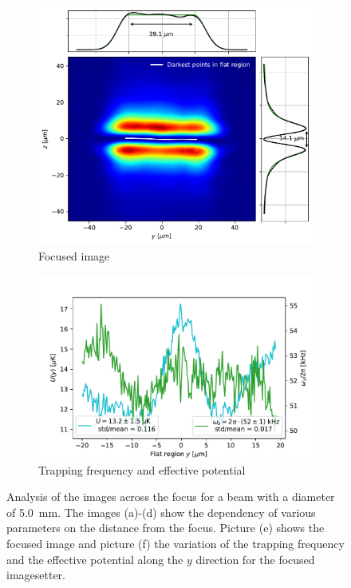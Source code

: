 \begin{figure}
    \begin{subfigure}{0.5\textwidth}
        \includegraphics[width=\textwidth]{chapters/chapter_3/figures/focused_anal.pdf}
        \caption{Focused image}
        \label{fig:focus_image}
    \end{subfigure}
    \begin{subfigure}{0.5\textwidth}
        \includegraphics[width=\textwidth]{chapters/chapter_3/figures/omega_U_5focus.pdf}
        \caption{Trapping frequency and effective potential}
        \label{fig:focus_U_omega}
    \end{subfigure}
    \caption{Analysis of the images across the focus for a beam with a diameter of \SI{5.0}{mm}. The images (a)-(d) show the dependency of various parameters on the distance from the focus. Picture (e) shows the focused image and picture (f) the variation of the trapping frequency and the effective potential along the $y$ direction for the focused imagesetter.}
    \label{fig:analysis_focus}
\end{figure}

